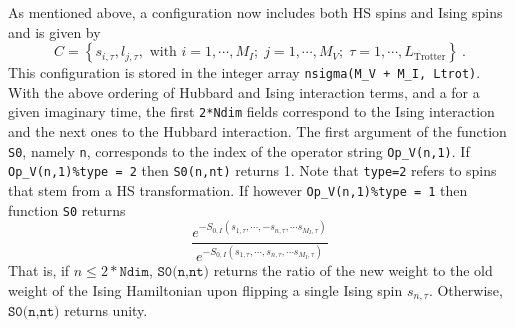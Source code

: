 As mentioned above,  a configuration now includes both HS spins and Ising spins and is given by
\begin{equation}
	C = \left\{   s_{i,\tau} ,  l_{j,\tau},  \text{ with }  i=1,\cdots, M_I;\;  j = 1,\cdots, M_V;\;  \tau=1,\cdots,L_\text{Trotter}  \right\}\:.
\end{equation}
This configuration is stored in the  integer array \texttt{nsigma(M\_V + M\_I, Ltrot)}.  With the above ordering of Hubbard and Ising interaction terms, and a for a given imaginary time, the first \texttt{2*Ndim} fields correspond to the Ising interaction and the next  ones to the Hubbard interaction.
The first   argument of the function \texttt{S0}, namely \texttt{n},  corresponds to the index of the operator  string 
\texttt{Op\_V(n,1)}. If \texttt{Op\_V(n,1)\%type = 2} then   \texttt{S0(n,nt)}  returns 1. Note that \texttt{type=2} refers to spins that stem from a  HS transformation. 
If however  \texttt{Op\_V(n,1)\%type = 1}  then function \texttt{S0}  returns
\begin{equation}
\frac{e^{-S_{0,I} \left(  s_{1,\tau},  \cdots,  - s_{n,\tau},  \cdots s_{M_I,\tau}   \right) } }{e^{-S_{0,I}  \left(  s_{1,\tau},  \cdots,   s_{n,\tau},  \cdots s_{M_I,\tau}   \right)   } }	
\end{equation}
That is,   if $n \leq 2* \texttt{Ndim} $,    $ \texttt{S0(n,nt)} $  returns the ratio of the new weight to the old weight  of the  Ising Hamiltonian upon flipping a single Ising spin $ s_{n,\tau} $.  Otherwise, $ \texttt{S0(n,nt)} $   returns unity. 

